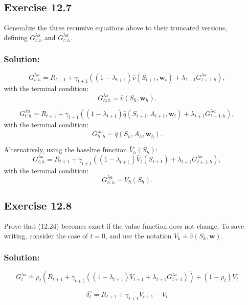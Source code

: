 \subsection*{Exercise 12.7}
Generalize the three recursive equations above to their truncated versions,
defining $G_{t:h}^{\lambda s}$ and $G_{t:h}^{\lambda a}$. 

\subsubsection*{Solution:}

\[
G_{t:h}^{\lambda s} = R_{t+1} + \gamma_{t+1} \left( (1 - \lambda_{t+1}) \hat{v}(S_{t+1}, \mathbf{w}_t) + \lambda_{t+1} G_{t+1:h}^{\lambda s} \right),
\]
with the terminal condition:
\[
G_{h:h}^{\lambda s} = \hat{v}(S_h, \mathbf{w}_h).
\]

\[
G_{t:h}^{\lambda a} = R_{t+1} + \gamma_{t+1} \left( (1 - \lambda_{t+1}) \hat{q}(S_{t+1}, A_{t+1}, \mathbf{w}_t) + \lambda_{t+1} G_{t+1:h}^{\lambda a} \right),
\]
with the terminal condition:
\[
G_{h:h}^{\lambda a} = \hat{q}(S_h, A_h, \mathbf{w}_h).
\]

Alternatively, using the baseline function \( \bar{V}_h(S_h) \):
\[
G_{t:h}^{\lambda a} = R_{t+1} + \gamma_{t+1} \left( (1 - \lambda_{t+1}) \bar{V}_t(S_{t+1}) + \lambda_{t+1} G_{t+1:h}^{\lambda a} \right),
\]
with the terminal condition:
\[
G_{h:h}^{\lambda a} = \bar{V}_h(S_h).
\]

\subsection*{Exercise 12.8}
Prove that (12.24) becomes exact if the value function does not change.
To save writing, consider the case of $t = 0$, and use the notation
$V_k \doteq \hat{v}(S_k, \mathbf{w})$.

\subsubsection*{Solution:}

\[
G_t^{\lambda s} \doteq \rho_t \left( R_{t+1} + \gamma_{t+1} \left( (1 - \lambda_{t+1}) V_{t+1} + \lambda_{t+1} G_{t+1}^{\lambda s} \right) \right) + (1 - \rho_t) V_t
\]


\[
    \delta_t^s = R_{t+1} + \gamma_{t+1} V_{t+1} - V_t
\]

